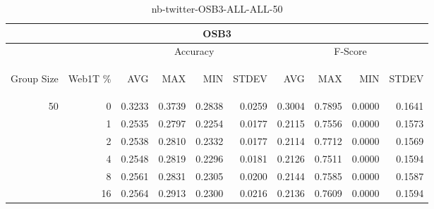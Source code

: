 \begin{center}
\begin{table}[htbp]
\begin{tabular}{ | r | r | r | r | r | r | r | r | r | r |}
\hline
\multicolumn{10}{|c|}{OSB3}\\
\hline
 & & \multicolumn{4}{|c|}{Accuracy} & \multicolumn{4}{|c|}{F-Score}\\ \cline{3-10}
\begin{sideways}Group Size\end{sideways} & \begin{sideways}Web1T \%\end{sideways} & \begin{sideways}AVG\end{sideways} & \begin{sideways}MAX\end{sideways} & \begin{sideways}MIN\end{sideways} & \begin{sideways}STDEV\end{sideways} & \begin{sideways}AVG\end{sideways} & \begin{sideways}MAX\end{sideways} & \begin{sideways}MIN\end{sideways} & \begin{sideways}STDEV\end{sideways}\\
\hline
\multirow{5}{*}{50}
 & 0 & 0.3233 & 0.3739 & 0.2838 & 0.0259 & 0.3004 & 0.7895 & 0.0000 & 0.1641\\ \cline{2-10}
 & 1 & 0.2535 & 0.2797 & 0.2254 & 0.0177 & 0.2115 & 0.7556 & 0.0000 & 0.1573\\ \cline{2-10}
 & 2 & 0.2538 & 0.2810 & 0.2332 & 0.0177 & 0.2114 & 0.7712 & 0.0000 & 0.1569\\ \cline{2-10}
 & 4 & 0.2548 & 0.2819 & 0.2296 & 0.0181 & 0.2126 & 0.7511 & 0.0000 & 0.1594\\ \cline{2-10}
 & 8 & 0.2561 & 0.2831 & 0.2305 & 0.0200 & 0.2144 & 0.7585 & 0.0000 & 0.1587\\ \cline{2-10}
 & 16 & 0.2564 & 0.2913 & 0.2300 & 0.0216 & 0.2136 & 0.7609 & 0.0000 & 0.1594\\ \cline{2-10}
\hline
\end{tabular}
\caption{nb-twitter-OSB3-ALL-ALL-50}
\label{table:nb-twitter-OSB3-ALL-ALL-50}
\end{table}
\end{center}

